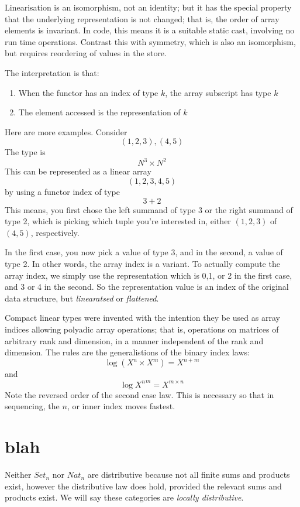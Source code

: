 \documentclass[oneside]{book}
\theoremstyle{plain}
\theoremstyle{definition}
\theoremstyle{plain}
\def\Set{\mathit{Set}}
\def\Nat{\mathit{Nat}}
\begin{document}
Linearisation is an isomorphism, not an identity; but it has the special
property that the underlying representation is not changed; that is, the order
of array elements is invariant. In code, this means it is a suitable static
cast, involving no run time operations. Contrast this with symmetry, which is 
also an isomorphism, but requires reordering of values in the store.

The interpretation is that:
\begin{enumerate}
\item When the functor has an index of type $k$, the array subscript has type $k$
\item The element accessed is the representation of $k$
\end{enumerate}

Here are more examples. Consider
$$(1,2,3),(4,5)$$
The type is 
$$N^3\times N^2$$
This can be represented as a linear array
$$(1,2,3,4,5)$$
by using a functor index of type
$$3+2$$
This means, you first chose the left summand of type 3 or the right
summand of type 2, which is picking which tuple you're interested in,
either $(1,2,3)$ of $(4,5)$, respectively.

In the first case, you now pick a value of type 3, and in the second,
a value of type 2. In other words, the array index is a variant.
To actually compute the array index, we simply use the representation
which is 0,1, or 2 in the first case, and 3 or 4 in the second.
So the representation value is an index of the original data structure,
but {\em linearatsed} or {\em flattened}.

Compact linear types were invented with the intention they be used
as array indices allowing polyadic array operations; that is,
operations on matrices of arbitrary rank and dimension, in a manner
independent of the rank and dimension. The rules are the generalistions
of the binary index laws:
$$\log (X^n\times X^m) = X ^ {n + m}$$
and
$$\log {X^n}^m = X ^ {m \times n}$$
Note the reversed order of the second case law. This is necessary
so that in sequencing, the $n$, or inner index moves fastest.

\chapter{blah}


Neither $\Set_n$ nor $\Nat_n$ are distributive because not
all finite sums and products exist, however the distributive law does hold, provided the relevant
sums and products exist. We will say these categories are {\em locally distributive}.
\end{document}
